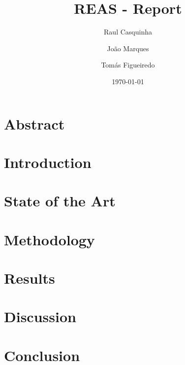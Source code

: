 \documentclass{article}
\title{REAS - Report}
\author{Raul Casquinha \and João Marques \and Tomás Figueiredo}
\date{\today}
\begin{document}
\maketitle

\section{Abstract}

\tableofcontents

\section{Introduction}

\section{State of the Art}

\section{Methodology}

\section{Results}

\section{Discussion}

\section{Conclusion}


\end{document}
